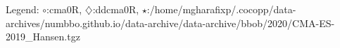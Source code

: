 Legend: {\color{NavyBlue}$\circ$}:cma0R, {\color{Magenta}$\diamondsuit$}:ddcma0R, {\color{Orange}$\star$}:/home/mgharafixp/.cocopp/data-archives/numbbo.github.io/data-archive/data-archive/bbob/2020/CMA-ES-2019\_Hansen.tgz